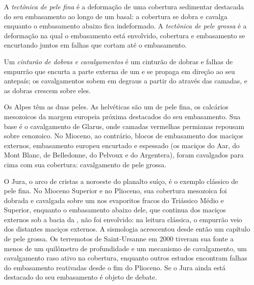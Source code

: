\begin{definition}\label{def:b2:alpine-orogen:skin}
A \emph{tectônica de pele fina} é a deformação de uma
cobertura sedimentar destacada do seu embasamento ao longo de um  basal: a cobertura se dobra e
cavalga enquanto o embasamento abaixo fica indeformado. A \emph{tectônica de pele
grossa} é a deformação na qual o embasamento está envolvido,
cobertura e embasamento se encurtando juntos em falhas que cortam até o embasamento.
\end{definition}

\begin{definition}\label{def:b2:alpine-orogen:ftb}
Um \emph{cinturão de dobras e cavalgamentos} é um cinturão de dobras e falhas de empurrão
que encurta a parte externa de um  e se propaga em direção ao seu antepaís; os cavalgamentos
sobem em degraus a partir do  através das camadas, e as dobras crescem sobre eles.
\end{definition}

Os Alpes têm as duas peles. As  helvéticas são um  de pele fina, os
calcários mesozoicos da margem europeia próxima destacados do seu embasamento. Sua base é
o cavalgamento de Glarus, onde camadas vermelhas permianas repousam sobre  cenozoico. No Mioceno, ao
contrário, blocos de embasamento dos maciços externos, embasamento europeu encurtado e espessado (os maciços
do Aar, do Mont Blanc, de Belledonne, do Pelvoux e do Argentera), foram cavalgados para cima com sua
cobertura: cavalgamento de pele grossa.

O Jura, o arco de cristas a noroeste do planalto suíço, é o exemplo clássico de pele
fina. No Mioceno Superior e no Plioceno, sua cobertura mesozoica foi dobrada e cavalgada sobre um
 nos evaporitos fracos do Triássico Médio e Superior, enquanto o embasamento abaixo
dele, que continua dos maciços externos sob a bacia da , não foi envolvido: na
leitura clássica, o empurrão veio dos distantes maciços externos. A sismologia acrescentou desde então
um capítulo de pele grossa. Os terremotos de Saint-Ursanne em 2000 tiveram sua fonte
a menos de um quilômetro de profundidade e um mecanismo de cavalgamento, um cavalgamento raso ativo na cobertura,
enquanto outros estudos encontram falhas do embasamento reativadas desde o fim do Plioceno. Se
o Jura ainda está destacado do seu embasamento é objeto de debate.

